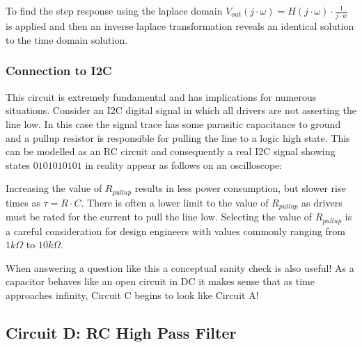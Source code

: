 \documentclass[main.tex]{subfiles}
\begin{document}

To find the step response using the laplace domain $V_{out}(j \cdot \omega) = H(j \cdot \omega) \cdot \frac{1}{j \cdot w}$ is applied and then an inverse laplace transformation reveals an identical solution to the time domain solution.

\subsubsection{Connection to I2C} %
This circuit is extremely fundamental and has implications for numerous situations. Consider an I2C digital signal in which all drivers are not asserting the line low. In this case the signal trace has some parasitic capacitance to ground and a pullup resistor is responsible for pulling the line to a logic high state. This can be modelled as an RC circuit and consequently a real I2C signal showing states $0101010101$ in reality appear as follows on an oscilloscope:


Increasing the value of $R_{pullup}$ results in less power consumption, but slower rise times as $\tau = R \cdot C$. There is often a lower limit to the value of $R_{pullup}$ as drivers must be rated for the current to pull the line low. Selecting the value of $R_{pullup}$ is a careful consideration for design engineers with values commonly ranging from $1 k \Omega$ to $10 k \Omega$.



When answering a question like this a conceptual sanity check is also useful! As a capacitor behaves like an open circuit in DC it makes sense that as time approaches infinity, Circuit C begins to look like Circuit A! 

\subsection{Circuit D: RC High Pass Filter}
\end{document}
